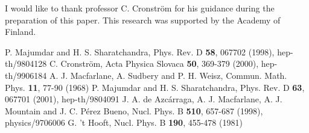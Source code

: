 \documentclass[a4paper,12pt]{article}
\begin{document}
I would like to thank professor C. Cronstr\"om for his guidance during the
preparation of this paper. This research was supported by the Academy of Finland.


\begin{thebibliography}{9}

 P. Majumdar and H. S. Sharatchandra, Phys. Rev. D {\bf 58},
067702 (1998), hep-th/9804128
 C. Cronstr\"om, Acta Physica Slovaca {\bf 50}, 369-379 (2000), hep-th/9906184
 A. J. Macfarlane, A. Sudbery and P. H. Weisz, Commun. Math. Phys.
{\bf 11}, 77-90 (1968)
 P. Majumdar and H. S. Sharatchandra, Phys. Rev. D {\bf 63},
067701 (2001), hep-th/9804091
 J. A. de Azc\'arraga, A. J. Macfarlane, A. J. Mountain and J. C. P\'erez Bueno, Nucl. Phys. B {\bf 510}, 657-687 (1998), physics/9706006
 G. 't Hooft, Nucl. Phys. B {\bf 190}, 455-478 (1981)

\end{thebibliography}
\end{document}
